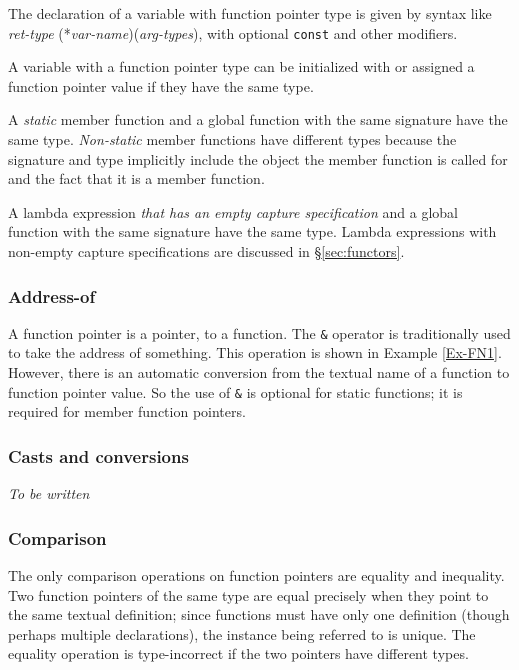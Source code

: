 The declaration of a variable with function pointer type is given by syntax like\\
\emph{ret-type} (*\emph{var-name})(\emph{arg-types}), with optional \lstinline|const| and other modifiers.

A variable with a function pointer type can be initialized with or assigned a function pointer value if they have the same type.

A \emph{static} member function and
a global function with the same signature have the same type.
\emph{Non-static} member functions have different types because
the signature and type implicitly include the object the member function
is called for and the fact that it is a member function.

A lambda expression \emph{that has an empty capture specification} and
a global function with the same signature have the same type.
Lambda expressions with non-empty capture specifications are discussed
in \S\ref{sec:functors}.

\subsubsection{Address-of}

A function pointer is a pointer, to a function.
The \lstinline|&| operator is traditionally used to take
the address of something.
This operation is shown in Example \ref{Ex-FN1}.
However, there is an automatic conversion from the textual
name of a function to function pointer value.
So the use of \lstinline|&| is optional for static functions; it is required for member function pointers.

\subsubsection{Casts and conversions}

\textit{To be written}

\subsubsection{Comparison}

The only comparison operations on function pointers are
equality and inequality. Two function pointers of the
same type are equal precisely when they point to the same
textual definition; since functions must have only one
definition (though perhaps multiple declarations),
the instance being referred to is unique.
The equality operation is type-incorrect if the two
pointers have different types.

